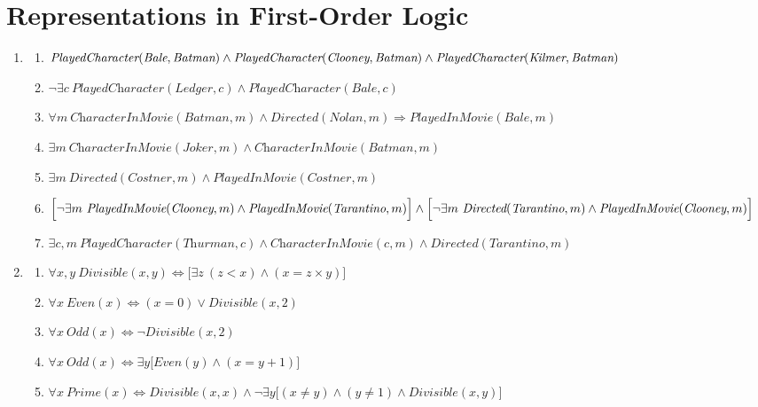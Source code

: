 \section{Representations in First-Order Logic}

\begin{enumerate}
\item
\begin{enumerate}
\item $\textit{PlayedCharacter}(\textit{Bale}, \textit{Batman}) \land\\
\textit{PlayedCharacter}(\textit{Clooney}, \textit{Batman}) \land\\
\textit{PlayedCharacter}(\textit{Kilmer}, \textit{Batman})$
\item $\neg \exists c ~ \textit{PlayedCharacter}(\textit{Ledger}, c) \land \textit{PlayedCharacter}(\textit{Bale}, c)$
\item $\forall m ~ \textit{CharacterInMovie}(\textit{Batman}, m) \land \textit{Directed}(\textit{Nolan}, m) \Rightarrow \textit{PlayedInMovie}(\textit{Bale}, m)$
\item $\exists m ~ \textit{CharacterInMovie}(\textit{Joker}, m) \land \textit{CharacterInMovie}(\textit{Batman}, m)$
\item $\exists m ~ \textit{Directed}(\textit{Costner}, m) \land \textit{PlayedInMovie}(\textit{Costner}, m)$
\item $\Big[\neg \exists m ~ \textit{PlayedInMovie}(\textit{Clooney}, m) \land \textit{PlayedInMovie}(\textit{Tarantino}, m)\Big] \land\\
\Big[ \neg \exists m ~ \textit{Directed}(\textit{Tarantino}, m) \land \textit{PlayedInMovie}(\textit{Clooney}, m) \Big]$
\item $\exists c, m ~ \textit{PlayedCharacter}(\textit{Thurman}, c) \land \textit{CharacterInMovie}(c, m) \land \textit{Directed}(\textit{Tarantino}, m)$
\end{enumerate}

\item
\begin{enumerate}
\item $\forall x, y ~ \textit{Divisible}(x, y) \Leftrightarrow \big[ \exists z ~ (z < x) \land (x = z \times y) \big]$
\item $\forall x ~ \textit{Even}(x) \Leftrightarrow (x = 0) \lor \textit{Divisible}(x, 2)$
\item $\forall x ~ \textit{Odd}(x) \Leftrightarrow \neg \textit{Divisible}(x, 2)$
\item $\forall x ~ \textit{Odd}(x) \Leftrightarrow \exists y \big[ \textit{Even}(y) \land (x = y + 1) \big]$
\item $\forall x ~ \textit{Prime}(x) \Leftrightarrow \textit{Divisible}(x, x) \land \neg \exists y \big[ (x \neq y) \land (y \neq 1) \land \textit{Divisible}(x, y) \big]$
\end{enumerate}


\end{enumerate}
